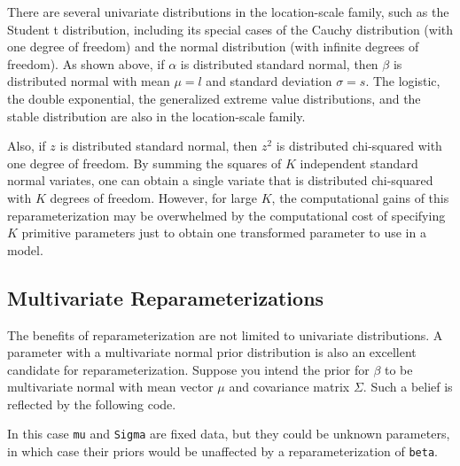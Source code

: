 There are several univariate distributions in the location-scale
family, such as the Student t distribution, including its special
cases of the Cauchy distribution (with one degree of freedom) and the
normal distribution (with infinite degrees of freedom). As shown above,
if $\alpha$ is distributed standard normal, then $\beta$ is distributed
normal with mean $\mu = l$ and standard deviation $\sigma = s$. The
logistic, the double exponential, the generalized extreme value
distributions, and the stable distribution are also in the
location-scale family.

Also, if $z$ is distributed standard normal, then $z^2$ is distributed
chi-squared with one degree of freedom. By summing the squares of $K$
independent standard normal variates, one can obtain a single variate
that is distributed chi-squared with $K$ degrees of freedom. However,
for large $K$, the computational gains of this reparameterization may
be overwhelmed by the computational cost of specifying $K$ primitive
parameters just to obtain one transformed parameter to use in a model.



\subsection{Multivariate Reparameterizations}

The benefits of reparameterization are not limited to univariate
distributions. A parameter with a multivariate normal prior distribution
is also an excellent candidate for reparameterization. Suppose you intend
the prior for $\beta$ to be multivariate normal with mean vector $\mu$
and covariance matrix $\Sigma$. Such a belief is reflected by the
following code.
%
\begin{stancode}
data {
  int<lower=2> K;
  vector[K] mu;
  cov_matrix[K] Sigma;
  ...
parameters {
  vector[K] beta;
  ...
model {
  beta ~ multi_normal(mu, Sigma);
  ...
\end{stancode}
%
In this case \Verb|mu| and \Verb|Sigma| are fixed data, but they could
be unknown parameters, in which case their priors would be unaffected
by a reparameterization of \Verb|beta|.

